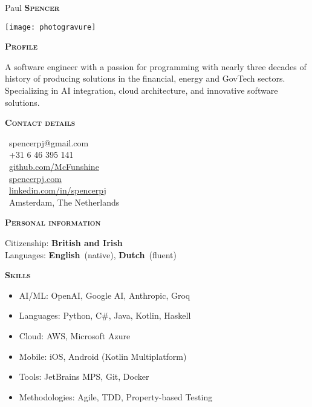 \documentclass[11pt, a4paper]{article}
\newcommand{\headleft}[1]{\vspace*{3ex}\textsc{\textbf{#1}}\par%
    \vspace*{-1.5ex}\hrulefill\par\vspace*{0.7ex}}
\begin{document}
\setlength{\topskip}{0pt}
\setlength{\parindent}{0pt}
\setlength{\parskip}{0pt}
\setlength{\fboxsep}{0pt}
\pagestyle{empty}
\raggedbottom

\begin{minipage}[t]{0.33\textwidth}
\colorbox{cvblue}{\begin{minipage}[t][5mm][t]{\textwidth}\null\hfill\null\end{minipage}}

\vspace{-.2ex}
\colorbox{cvblue!90}{\color{white}
\textwidth\relax
\begin{minipage}[t][293mm][t]{0.82\textwidth}
\raggedright
\vspace*{2.5ex}

\Large Paul \textbf{\textsc{Spencer}} \normalsize 

\vspace*{2ex}
\begin{center}
\texttt{[image: photogravure]}
\end{center}

\vspace*{2ex}

\headleft{Profile}
A software engineer with a passion for programming with nearly three decades of history of producing solutions in the financial, energy and GovTech sectors. Specializing in AI integration, cloud architecture, and innovative software solutions.

\headleft{Contact details}
\small
\MVAt\ spencerpj@gmail.com \\[0.4ex]
\Mobilefone\ +31 6 46 395 141 \\[0.5ex]
\faGithub\ \href{https://github.com/McFunshine}{\color{white}github.com/McFunshine} \\[0.5ex]
\faGlobe\ \href{https://spencerpj.com}{\color{white}spencerpj.com} \\[0.5ex]
\faLinkedin\ \href{https://linkedin.com/in/spencerpj}{\color{white}linkedin.com/in/spencerpj} \\[0.5ex]
\faMapMarker\ Amsterdam, The Netherlands
\normalsize

\headleft{Personal information}
Citizenship: \textbf{British and Irish} \\[0.5ex]
Languages: \textbf{English}~(native), \textbf{Dutch}~(fluent)

\headleft{Skills}
\begin{itemize}
\item AI/ML: OpenAI, Google AI, Anthropic, Groq
\item Languages: Python, C\#, Java, Kotlin, Haskell
\item Cloud: AWS, Microsoft Azure
\item Mobile: iOS, Android (Kotlin Multiplatform)
\item Tools: JetBrains MPS, Git, Docker
\item Methodologies: Agile, TDD, Property-based Testing
\end{itemize} 

\end{minipage}%
\textwidth\relax
}
\end{minipage}
\end{document}
